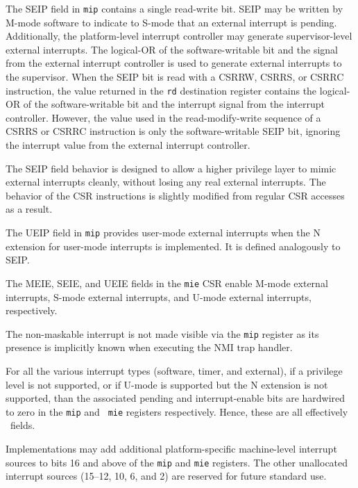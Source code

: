 The SEIP field in {\tt mip} contains a single read-write bit.  SEIP
may be written by M-mode software to indicate to S-mode that an
external interrupt is pending.  Additionally, the platform-level
interrupt controller may generate supervisor-level external interrupts.  The
logical-OR of the software-writable bit and the signal from the
external interrupt controller is used to generate external interrupts
to the supervisor.  When the SEIP bit is read with a CSRRW, CSRRS, or
CSRRC instruction, the value returned in the {\tt rd} destination
register contains the logical-OR of the software-writable bit and the
interrupt signal from the interrupt controller.  However, the value
used in the read-modify-write sequence of a CSRRS or CSRRC instruction
is only the software-writable SEIP bit, ignoring the interrupt value
from the external interrupt controller.

\begin{commentary}
  The SEIP field behavior is designed to allow a higher privilege
  layer to mimic external interrupts cleanly, without losing any real
  external interrupts.  The behavior of the CSR instructions is
  slightly modified from regular CSR accesses as a result.
\end{commentary}

The UEIP field in {\tt mip} provides user-mode external interrupts when the
N extension for user-mode interrupts is implemented.  It is defined
analogously to SEIP.

The MEIE, SEIE, and UEIE fields in the {\tt mie} CSR enable M-mode external
interrupts, S-mode external interrupts, and U-mode external interrupts,
respectively.

\begin{commentary}
The non-maskable interrupt is not made visible via the {\tt mip}
register as its presence is implicitly known when executing the NMI
trap handler.
\end{commentary}

For all the various interrupt types (software, timer, and external),
if a privilege level is not supported, or if U-mode is supported but
the N extension is not supported, than the associated pending and
interrupt-enable bits are hardwired to zero in the {\tt mip} and {\tt
  mie} registers respectively.  Hence, these are all effectively
\warl\ fields.

Implementations may add additional platform-specific machine-level
interrupt sources to bits 16 and above of the {\tt mip} and {\tt mie}
registers.  The other unallocated interrupt sources (15--12, 10, 6, and 2)
are reserved for future standard use.

